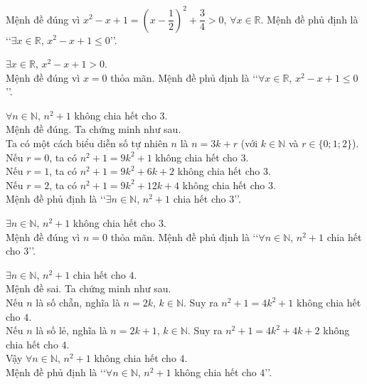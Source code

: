 \begin{bt}
{\begin{listEX}
			Mệnh đề đúng vì $x^2-x+1=\left( x-\dfrac{1}{2}\right)^2+\dfrac{3}{4}>0$, $\forall x\in \mathbb{R}$. Mệnh đề phủ định là  \lq\lq $\exists x\in \mathbb{R}$, $x^2-x+1\le 0$\rq\rq.
			\item $\exists x\in \mathbb{R}$, $x^2-x+1>0$.\\ 
			Mệnh đề đúng vì $x=0$ thỏa mãn. Mệnh đề phủ định là \lq\lq $\forall x\in  \mathbb{R}$, $x^2-x+1\le 0$\rq\rq.
			\item $\forall n\in  \mathbb{N}$, $n^2+1$ không chia hết cho $3$.\\
			Mệnh đề đúng. Ta  chứng minh như sau.\\
			Ta có một cách biểu diễn số tự nhiên $n$ là  $n=3k+r$ (với $k\in \mathbb{N}$ và $r\in \{ 0;1;2\}$).\\
			Nếu $r=0$, ta có  $n^2+1=9k^2+1$ không chia hết cho $3$.\\
			Nếu $r=1$, ta có $n^2+1=9k^2+6k+2$ không chia hết cho  $3$.\\
			Nếu $r=2$, ta có $n^2+1=9k^2+12k+4$  không chia hết cho $3$.\\
			Mệnh đề phủ định là \lq\lq  $\exists n\in \mathbb{N}$, $n^2+1$ chia hết cho $3$\rq\rq.
			\item $\exists n\in  \mathbb{N}$, $n^2+1$ không chia hết cho $3$.\\
			Mệnh đề đúng vì $n=0$ thỏa mãn. Mệnh đề phủ định là \lq\lq $\forall n\in  \mathbb{N}$, $n^2+1$ chia hết cho $3$\rq\rq.
			\item $\exists n\in \mathbb{N}$,  $n^2+1$ chia hết cho $4$.\\
			Mệnh đề sai.  Ta chứng minh như sau.\\
			Nếu $n$ là số chẵn, nghĩa là $n=2k$, $k\in \mathbb{N}$. Suy ra $n^2+1=4k^2+1$ không chia hết cho  $4$.\\
			Nếu $n$ là số lẻ, nghĩa là $n=2k+1$,  $k\in \mathbb{N}$. Suy ra $n^2+1=4k^2+4k+2$ không chia hết cho $4$.\\
			Vậy $\forall n\in \mathbb{N}$, $n^2+1$ không chia hết  cho $4$.\\
			Mệnh đề  phủ định là \lq\lq $\forall n\in \mathbb{N}$, $n^2+1$ không chia hết cho $4$\rq\rq.
		\end{listEX}
	} 
\end{bt}

